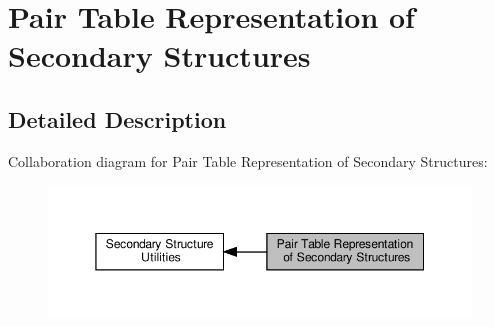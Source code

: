 \hypertarget{group__struct__utils__pair__table}{}\section{Pair Table Representation of Secondary Structures}
\label{group__struct__utils__pair__table}


\subsection{Detailed Description}
Collaboration diagram for Pair Table Representation of Secondary Structures\+:
\nopagebreak
\begin{figure}[H]
\begin{center}
\leavevmode
\includegraphics[width=350pt]{group__struct__utils__pair__table}
\end{center}
\end{figure}
